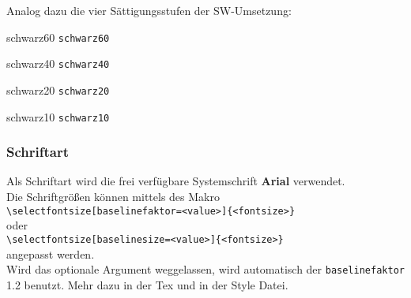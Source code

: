 \documentclass[rgb]{beamer}
\begin{document}
\begin{frame}[t]
	Analog dazu die vier Sättigungsstufen der SW-Umsetzung:\\
	\vskip 12pt
	\begin{beamercolorbox}[wd=0.5\textwidth, ht=3ex, dp=2ex, center]{schwarz60}
		\texttt{schwarz60}
	\end{beamercolorbox}
	\vskip 12pt
	\begin{beamercolorbox}[wd=0.5\textwidth, ht=3ex, dp=2ex, center]{schwarz40}
		\texttt{schwarz40}
	\end{beamercolorbox}
	\vskip 12pt
	\begin{beamercolorbox}[wd=0.5\textwidth, ht=3ex, dp=2ex, center]{schwarz20}
		\texttt{schwarz20}
	\end{beamercolorbox}
	\vskip 12pt
	\begin{beamercolorbox}[wd=0.5\textwidth, ht=3ex, dp=2ex, center]{schwarz10}
		\texttt{schwarz10}
	\end{beamercolorbox}
\end{frame}


\begin{frame}[t]
	\frametitle{Schriftart}
	Als Schriftart wird die frei verfügbare Systemschrift \textbf{Arial} verwendet.\\
	\vskip 18pt
	Die Schriftgrößen können mittels des Makro\\
	\texttt{\textbackslash selectfontsize[baselinefaktor=<value>]\{<fontsize>\}}\\
    oder\\
    	\texttt{\textbackslash selectfontsize[baselinesize=<value>]\{<fontsize>\}}\\
	angepasst werden.\\[\baselineskip]
	Wird das optionale Argument weggelassen, wird automatisch der \texttt{baselinefaktor} 1.2 benutzt. Mehr dazu in der Tex und in der Style Datei.
\end{frame}

\end{document}
